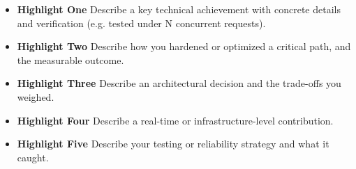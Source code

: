 \begin{itemize}
  \item \textbf{Highlight One} Describe a key technical achievement with concrete details and verification (e.g. tested under N concurrent requests).
  \item \textbf{Highlight Two} Describe how you hardened or optimized a critical path, and the measurable outcome.
  \item \textbf{Highlight Three} Describe an architectural decision and the trade-offs you weighed.
  \item \textbf{Highlight Four} Describe a real-time or infrastructure-level contribution.
  \item \textbf{Highlight Five} Describe your testing or reliability strategy and what it caught.
\end{itemize}
